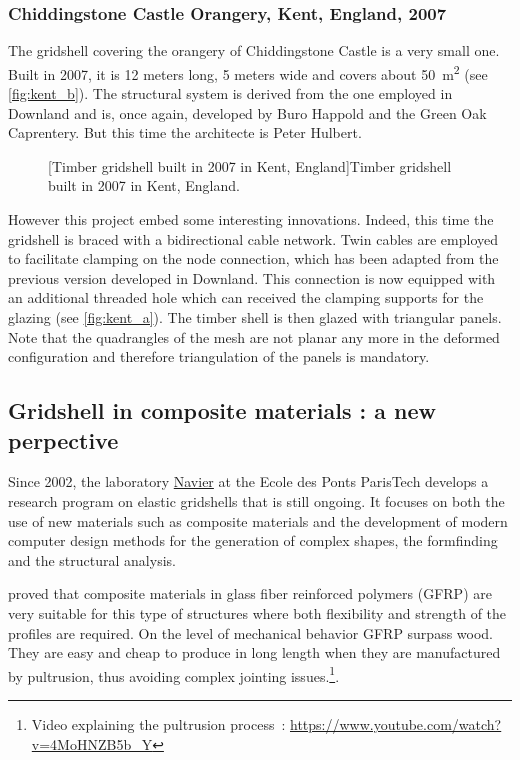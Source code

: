 \subsubsection{Chiddingstone Castle Orangery, Kent, England, 2007}
The gridshell covering the orangery of Chiddingstone Castle is a very small one. Built in 2007, it is 12 meters long, 5 meters wide and covers about \SI{50}{m^2} (see \cref{fig:kent_b}). The structural system is derived from the one employed in Downland and is, once again, developed by Buro Happold and the Green Oak Caprentery. But this time the architecte is Peter Hulbert.
 \begin{figure}[h]
		\hspace*{\fill}
		\vspace{10pt}
		[Timber gridshell built in 2007 in Kent, England]{Timber gridshell built in 2007 in Kent, England.}
		\label{fig:kent} 
\end{figure}

However this project embed some interesting innovations. Indeed, this time the gridshell is braced with a bidirectional cable network. Twin cables are employed to facilitate clamping on the node connection, which has been adapted from the previous version developed in Downland. This connection is now equipped with an additional threaded hole which can received the clamping supports for the glazing (see \cref{fig:kent_a}). The timber shell is then glazed with triangular panels. Note that the quadrangles of the mesh are not planar any more in the deformed configuration and therefore triangulation of the panels is mandatory.

\subsection{Gridshell in composite materials : a new perpective}
Since 2002, the laboratory \href{http://navier.enpc.fr}{Navier} at the Ecole des Ponts ParisTech develops a research program on elastic gridshells that is still ongoing. It focuses on both the use of new materials such as composite materials and the development of modern computer design methods for the generation of complex shapes, the formfinding and the structural analysis.

\citet{Douthe2010a} proved that composite materials in glass fiber reinforced polymers (GFRP) are very suitable for this type of structures where both flexibility and strength of the profiles are required. On the level of mechanical behavior GFRP surpass wood. They are easy and cheap to produce in long length when they are manufactured by pultrusion, thus avoiding complex jointing issues.\footnote{Video explaining the pultrusion process~: \url{https://www.youtube.com/watch?v=4MoHNZB5b_Y}}.

